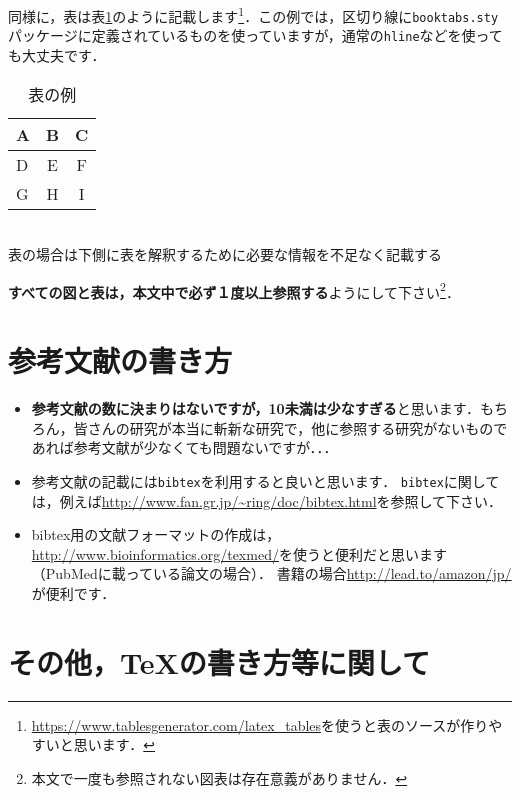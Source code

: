 \documentclass[dvipdfmx,autodetect-engine]{jsreport}
\begin{document}
同様に，表は表\ref{tab:example}のように記載します\footnote{\url{https://www.tablesgenerator.com/latex_tables}を使うと表のソースが作りやすいと思います．}．この例では，区切り線に\texttt{booktabs.sty}パッケージに定義されているものを使っていますが，通常の\texttt{hline}などを使っても大丈夫です．

\begin{table}[h]
\caption{\label{tab:example} 表の例}
\begin{center}
\begin{tabular}{lcc}
\toprule
A & B & C \\
\midrule
D & E & F \\
G & H & I \\
\bottomrule
\end{tabular}\\
{\footnotesize 
表の場合は下側に表を解釈するために必要な情報を不足なく記載する}
\end{center}
\end{table}

\textbf{すべての図と表は，本文中で必ず１度以上参照する}ようにして下さい\footnote{本文で一度も参照されない図表は存在意義がありません．}．

\section{参考文献の書き方}

\begin{itemize}
\item \textbf{参考文献の数に決まりはないですが，10未満は少なすぎる}と思います．もちろん，皆さんの研究が本当に斬新な研究で，他に参照する研究がないものであれば参考文献が少なくても問題ないですが．．．
\item 参考文献の記載には\texttt{bibtex}を利用すると良いと思います．
\texttt{bibtex}に関しては，例えば\url{http://www.fan.gr.jp/~ring/doc/bibtex.html}を参照して下さい．
%
\item bibtex用の文献フォーマットの作成は，\url{http://www.bioinformatics.org/texmed/}を使うと便利だと思います（PubMedに載っている論文の場合）．
書籍の場合\url{http://lead.to/amazon/jp/}が便利です．
\end{itemize}



\section{その他，\TeX の書き方等に関して}
\end{document}
